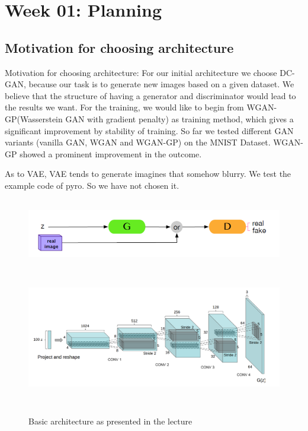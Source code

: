 \chapter{Week 01: Planning}
\section{Motivation for choosing architecture}
Motivation for choosing architecture:
For our initial architecture we choose DC-GAN, because our task is to generate new images based on a given dataset. We believe that the structure of having a generator and discriminator would lead to the results we want.
For the training, we would like to begin from WGAN-GP(Wasserstein GAN with gradient penalty) as training method, which gives a significant improvement by stability of training. So far we tested different GAN variants (vanilla GAN, WGAN and WGAN-GP) on the MNIST Dataset. WGAN-GP showed a prominent improvement in the outcome.


As to VAE, VAE tends to generate imagines that somehow blurry. We test the example code of pyro. So we have not chosen it.


\begin{figure}[H]
    \centering
    \includegraphics[height=3cm]{images/dc-gan_layout.png}
    \includegraphics[height=6cm]{images/dc-gan_example.png}
    \caption{Basic architecture as presented in the lecture}
    \label{fig:dc-gan-example}
\end{figure}




